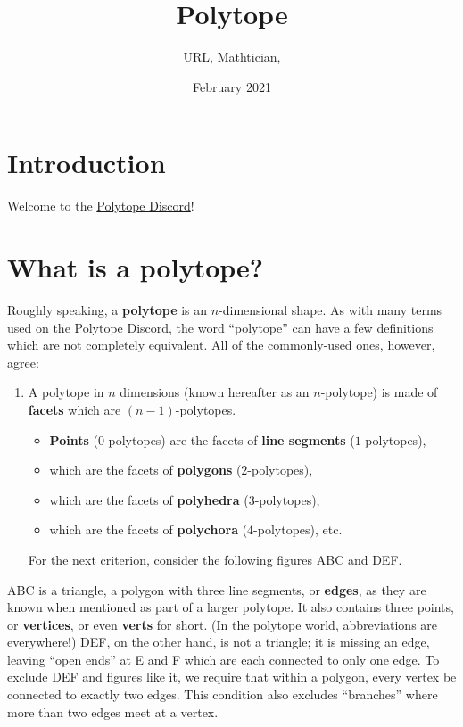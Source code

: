 \documentclass{article}
\title{Polytope}
\author{URL, Mathtician, }
\date{February 2021}
\begin{document}
\maketitle

\section{Introduction}
Welcome to the \href{https://discord.gg/invite/zMRu7T4}{Polytope Discord}!

\section{What is a polytope?}
Roughly speaking, a \textbf{polytope} is an $n$-dimensional shape.
As with many terms used on the Polytope Discord,
the word ``polytope'' can have a few definitions which are not completely equivalent.
All of the commonly-used ones, however, agree:
\begin{enumerate}
  \item
A polytope in $n$ dimensions (known hereafter as an $n$-polytope)
is made of \textbf{facets} which are $(n-1)$-polytopes.
\begin{itemize}
\item \textbf{Points} ($0$-polytopes) are the facets of \textbf{line segments} ($1$-polytopes),
\item which are the facets of \textbf{polygons} ($2$-polytopes),
\item which are the facets of \textbf{polyhedra} ($3$-polytopes),
\item which are the facets of \textbf{polychora} ($4$-polytopes), etc.
\end{itemize}
For the next criterion, consider the following figures ABC and DEF.
\end{enumerate}

\begin{center}
\end{center}

ABC is a triangle, a polygon with three line segments,
or \textbf{edges}, as they are known when mentioned as part of a larger polytope.
It also contains three points, or \textbf{vertices}, or even \textbf{verts} for short.
(In the polytope world, abbreviations are everywhere!)
DEF, on the other hand, is not a triangle; it is missing an edge,
leaving ``open ends'' at E and F which are each connected to only one edge.
To exclude DEF and figures like it,
we require that within a polygon, every vertex be connected to exactly two edges.
This condition also excludes ``branches'' where more than two edges meet at a vertex.
\end{document}
